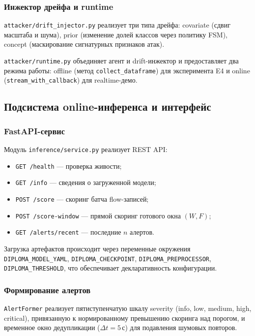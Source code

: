 \subsubsection{Инжектор дрейфа и runtime}

\texttt{attacker/drift\_injector.py} реализует три типа дрейфа:
covariate (сдвиг масштаба и шума), prior (изменение долей классов
через политику FSM), concept (маскирование сигнатурных признаков
атак).

\texttt{attacker/runtime.py} объединяет агент и drift-инжектор и
предоставляет два режима работы: offline (метод
\texttt{collect\_dataframe}) для эксперимента E4 и online
(\texttt{stream\_with\_callback}) для realtime-демо.

\subsection{Подсистема online-инференса и интерфейс}

\subsubsection{FastAPI-сервис}

Модуль \texttt{inference/service.py} реализует REST API:

\begin{itemize}
    \item \texttt{GET /health} --- проверка живости;
    \item \texttt{GET /info} --- сведения о загруженной модели;
    \item \texttt{POST /score} --- скоринг батча flow-записей;
    \item \texttt{POST /score-window} --- прямой скоринг готового
    окна $(W, F)$;
    \item \texttt{GET /alerts/recent} --- последние $n$ алертов.
\end{itemize}

Загрузка артефактов происходит через переменные окружения
\texttt{DIPLOMA\_MODEL\_YAML}, \texttt{DIPLOMA\_CHECKPOINT},
\texttt{DIPLOMA\_PREPROCESSOR}, \texttt{DIPLOMA\_THRESHOLD}, что
обеспечивает декларативность конфигурации.

\subsubsection{Формирование алертов}

\texttt{AlertFormer} реализует пятиступенчатую шкалу severity
(info, low, medium, high, critical), привязанную к нормированному
превышению скоринга над порогом, и временное окно дедупликации
($\Delta t = 5$\,с) для подавления шумовых повторов.

